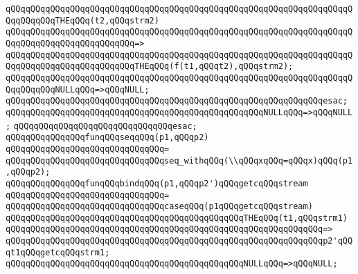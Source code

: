 \newline
\verb|qQQqqQQqqQQqqQQqqQQqqQQqqQQqqQQqqQQqqQQqqQQqqQQqqQQqqQQqqQQqqQQqqQQqqQQqqQQqqQQqTHEqQQq(t2,qQQqstrm2)|\newline
\verb|qQQqqQQqqQQqqQQqqQQqqQQqqQQqqQQqqQQqqQQqqQQqqQQqqQQqqQQqqQQqqQQqqQQqqQQqqQQqqQQqqQQqqQQqqQQqqQQq=>|\newline
\verb|qQQqqQQqqQQqqQQqqQQqqQQqqQQqqQQqqQQqqQQqqQQqqQQqqQQqqQQqqQQqqQQqqQQqqQQqqQQqqQQqqQQqqQQqqQQqqQQqTHEqQQq(f(t1,qQQqt2),qQQqstrm2);|\newline
\newline
\verb|qQQqqQQqqQQqqQQqqQQqqQQqqQQqqQQqqQQqqQQqqQQqqQQqqQQqqQQqqQQqqQQqqQQqqQQqqQQqqQQqNULLqQQq=>qQQqNULL;|\newline
\verb|qQQqqQQqqQQqqQQqqQQqqQQqqQQqqQQqqQQqqQQqqQQqqQQqqQQqqQQqqQQqqQQqesac;|\newline
\newline
\verb|qQQqqQQqqQQqqQQqqQQqqQQqqQQqqQQqqQQqqQQqqQQqqQQqqQQqNULLqQQq=>qQQqNULL;|\newline
\verb|qQQqqQQqqQQqqQQqqQQqqQQqqQQqqQQqesac;|\newline
\newline
\newline
\verb|qQQqqQQqqQQqqQQqfunqQQqseqqQQq(p1,qQQqp2)|\newline
\verb|qQQqqQQqqQQqqQQqqQQqqQQqqQQqqQQq=|\newline
\verb|qQQqqQQqqQQqqQQqqQQqqQQqqQQqqQQqseq_withqQQq(\\qQQqxqQQq=qQQqx)qQQq(p1,qQQqp2);|\newline
\newline
\newline
\verb|qQQqqQQqqQQqqQQqfunqQQqbindqQQq(p1,qQQqp2')qQQqgetcqQQqstream|\newline
\verb|qQQqqQQqqQQqqQQqqQQqqQQqqQQqqQQq=|\newline
\verb|qQQqqQQqqQQqqQQqqQQqqQQqqQQqqQQqcaseqQQq(p1qQQqgetcqQQqstream)|\newline
\newline
\verb|qQQqqQQqqQQqqQQqqQQqqQQqqQQqqQQqqQQqqQQqqQQqqQQqTHEqQQq(t1,qQQqstrm1)|\newline
\verb|qQQqqQQqqQQqqQQqqQQqqQQqqQQqqQQqqQQqqQQqqQQqqQQqqQQqqQQqqQQqqQQq=>|\newline
\verb|qQQqqQQqqQQqqQQqqQQqqQQqqQQqqQQqqQQqqQQqqQQqqQQqqQQqqQQqqQQqqQQqp2'qQQqt1qQQqgetcqQQqstrm1;|\newline
\newline
\verb|qQQqqQQqqQQqqQQqqQQqqQQqqQQqqQQqqQQqqQQqqQQqqQQqNULLqQQq=>qQQqNULL;|\newline
